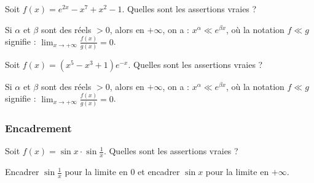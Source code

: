 \begin{question}

Soit $f(x)= e^{2x}-x^7+x^2-1$. Quelles sont les assertions vraies ?
\begin{answers}



\end{answers}
\begin{explanations}
Si $\alpha$ et $ \beta$ sont des réels $>0$, 
alors en $+\infty$, on a :
$ x^{\alpha}\ll  e^{\beta x}$, où la notation $f\ll g$ signifie : $\lim_{x \to + \infty} \frac{f(x)}{g(x)}=0 $.
\end{explanations}

\end{question}


\begin{question} 

Soit $f(x)= (x^5-x^3+1)e^{-x}$. Quelles sont les assertions vraies ?
\begin{answers}



\end{answers}
\begin{explanations}
Si $\alpha$ et $ \beta$ sont des réels $>0$, 
alors  en $+\infty$, on a :
$ x^{\alpha}\ll  e^{\beta x}$, où la notation $f\ll g$ signifie : $\lim_{x \to + \infty} \frac{f(x)}{g(x)}=0 $.
\end{explanations}

\end{question}



\subsubsection{Encadrement}

\begin{question}
 
Soit $f(x)= \sin x \cdot  \sin\frac{1}{x}$. Quelles sont les assertions vraies ?
\begin{answers}
    


\end{answers}
\begin{explanations}
 Encadrer $\sin\frac{1}{x}$ pour la limite en $0$   et encadrer $\sin x$ pour la limite en $+\infty$.
\end{explanations}

\end{question}


